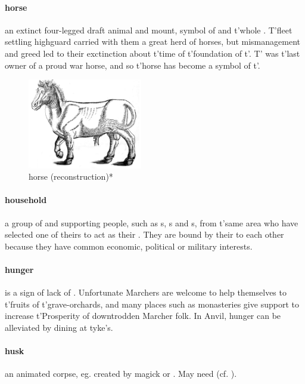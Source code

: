\paragraph{horse} an extinct four-legged draft animal and mount, symbol of  and t'\allowbreak whole . T'fleet settling highguard carried with them a great herd of horses, but mismanagement and greed led to their exctinction about t'\allowbreak time of t'\allowbreak foundation of t'\allowbreak {}. T' was t'\allowbreak last owner of a proud war horse, and so t'\allowbreak horse has become a symbol of t'\allowbreak {}.\begin{figure}\centering\includegraphics[width=5cm]{encyclopedia/Horse}\caption{horse (reconstruction)*}\end{figure}
\paragraph{household} a group of  and supporting people, such as s, s and s, from t'\allowbreak same area who have selected one of theirs to act as their . They are bound by their  to each other because they have common economic, political or military interests.
\paragraph{hunger} is a sign of lack of . Unfortunate Marchers are welcome to help themselves to t'\allowbreak fruits of t'\allowbreak grave-orchards, and many places such as monasteries give support to increase t'\allowbreak Prosperity of downtrodden Marcher folk. In Anvil, hunger can be alleviated by dining at tyke’s.
\paragraph{husk} an animated corpse, eg. created by  magick or . May need  (cf. ).
